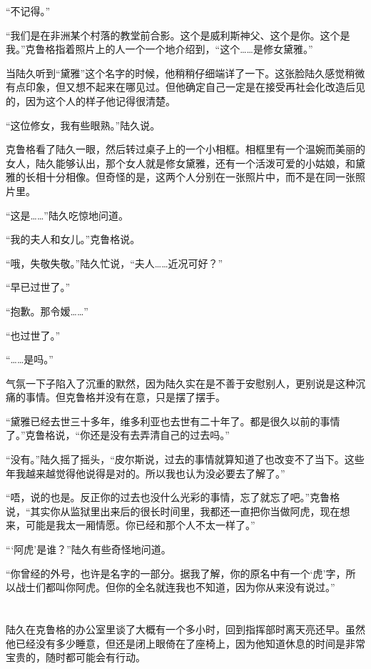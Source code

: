 “不记得。”

“我们是在非洲某个村落的教堂前合影。这个是威利斯神父、这个是你。这个是我。”克鲁格指着照片上的人一个一个地介绍到，“这个……是修女黛雅。”

当陆久听到“黛雅”这个名字的时候，他稍稍仔细端详了一下。这张脸陆久感觉稍微有点印象，但又想不起来在哪见过。但他确定自己一定是在接受再社会化改造后见的，因为这个人的样子他记得很清楚。

“这位修女，我有些眼熟。”陆久说。

克鲁格看了陆久一眼，然后转过桌子上的一个小相框。相框里有一个温婉而美丽的女人，陆久能够认出，那个女人就是修女黛雅，还有一个活泼可爱的小姑娘，和黛雅的长相十分相像。但奇怪的是，这两个人分别在一张照片中，而不是在同一张照片里。

“这是……”陆久吃惊地问道。

“我的夫人和女儿。”克鲁格说。

“哦，失敬失敬。”陆久忙说，“夫人……近况可好？”

“早已过世了。”

“抱歉。那令嫒……”

“也过世了。”

“……是吗。”

气氛一下子陷入了沉重的默然，因为陆久实在是不善于安慰别人，更别说是这种沉痛的事情。但克鲁格并没有在意，只是摆了摆手。

“黛雅已经去世三十多年，维多利亚也去世有二十年了。都是很久以前的事情了。”克鲁格说，“你还是没有去弄清自己的过去吗。”

“没有。”陆久摇了摇头，“皮尔斯说，过去的事情就算知道了也改变不了当下。这些年我越来越觉得他说得是对的。所以我也认为没必要去了解了。”

“唔，说的也是。反正你的过去也没什么光彩的事情，忘了就忘了吧。”克鲁格说，“其实你从监狱里出来后的很长时间里，我都还一直把你当做阿虎，现在想来，可能是我太一厢情愿。你已经和那个人不太一样了。”

“‘阿虎’是谁？”陆久有些奇怪地问道。

“你曾经的外号，也许是名字的一部分。据我了解，你的原名中有一个‘虎’字，所以战士们都叫你阿虎。但你的全名就连我也不知道，因为你从来没有说过。”

\section*{}

陆久在克鲁格的办公室里谈了大概有一个多小时，回到指挥部时离天亮还早。虽然他已经没有多少睡意，但还是闭上眼倚在了座椅上，因为他知道休息的时间是非常宝贵的，随时都可能会有行动。

